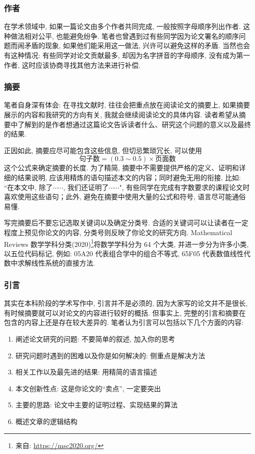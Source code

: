 \documentclass{formatBook}
\begin{document}
\subsubsection{作者}
在学术领域中, 如果一篇论文由多个作者共同完成, 一般按照字母顺序列出作者. 这种做法相对公平, 也能避免纷争. 笔者也曾遇到过有些同学因为论文署名的顺序问题而闹矛盾的现象, 如果他们能采用这一做法, 兴许可以避免这样的矛盾. 当然也会有这种情况: 有些同学对论文贡献最多, 却因为名字拼音的字母顺序, 没有成为第一作者, 这时应该协商寻找其他方法来进行补偿. 
\subsubsection{摘要}
笔者自身深有体会: 在寻找文献时, 往往会把重点放在阅读论文的摘要上, 如果摘要展示的内容和我研究的方向有关, 我就会继续阅读论文的具体内容. 读者希望从摘要中了解到的是作者想通过这篇论文告诉读者什么、研究这个问题的意义以及最终的结果. \par
正因如此, 摘要应尽可能包含这些信息, 但切忌繁琐冗长, 可以使用 $$\text{句子数}=(0.3 \sim 0.5)\times \text{页面数}$$ 这个公式\cite{pakhow}来确定摘要的长度. 为了精简, 摘要中不需要提供严格的定义、证明和详细的结果说明, 应该用精炼的语句描述本文的内容；同时避免无用的衔接, 比如: “在本文中, 除了$\cdots\cdots$, 我们还证明了$\cdots\cdots$", 有些同学在完成有字数要求的课程论文时喜欢使用这些语句；此外, 避免在摘要中使用大量的公式和符号, 语言尽可能通俗易懂. \par
写完摘要后不要忘记选取关键词以及确定分类号. 合适的关键词可以让读者在一定程度上预见你论文的内容, 分类号则反映了你论文的研究方向. Mathematical Reviews 数学学科分类(2020)\footnote{来自: \url{https://msc2020.org/}}将数学学科分为 64 个大类, 并进一步分为许多小类, 以五位代码标记, 例如: 05A20 代表组合学中的组合不等式, 65F05 代表数值线性代数中求解线性系统的直接方法. 
\subsubsection{引言}
其实在本科阶段的学术写作中, 引言并不是必须的, 因为大家写的论文并不是很长, 有时候摘要就可以对论文的内容进行较好的概括. 但事实上, 完整的引言和摘要在包含的内容上还是存在较大差异的. 笔者认为引言可以包括以下几个方面的内容: 
\begin{enumerate}
    \item 阐述论文研究的问题: 不要简单的叙述, 加入你的思考
    \item 研究问题时遇到的困难以及你是如何解决的: 侧重点是解决方法
    \item 相关工作以及最先进的结果: 用精简的语言描述
    \item 本文创新性点: 这是你论文的“卖点”, 一定要突出
    \item 主要的思路: 论文中主要的证明过程、实现结果的算法
    \item 概述文章的逻辑结构
\end{enumerate}
\end{document}
